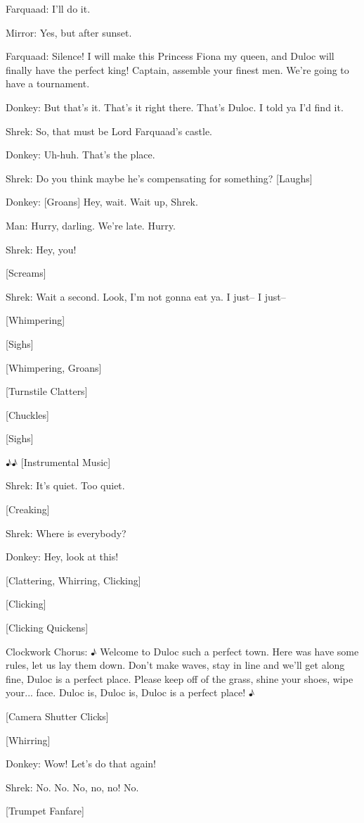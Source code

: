 \documentclass{article}
\begin{document}
Farquaad:
I'll do it.

Mirror:
Yes, but after sunset.

Farquaad:
Silence! I will make this Princess Fiona my queen, and Duloc will finally have the perfect king! Captain, assemble your finest men. We're going to have a tournament.

Donkey:
But that's it. That's it right there. That's Duloc. I told ya I'd find it.

Shrek:
So, that must be Lord Farquaad's castle.

Donkey:
Uh-huh. That's the place.

Shrek:
Do you think maybe he's compensating for something? [Laughs]

Donkey:
[Groans] Hey, wait. Wait up, Shrek.

Man:
Hurry, darling. We're late. Hurry.

Shrek:
Hey, you!

[Screams]

Shrek:
Wait a second. Look, I'm not gonna eat ya. I just-- I just--

[Whimpering]

[Sighs]

[Whimpering, Groans]

[Turnstile Clatters]

[Chuckles]

[Sighs]

♪♪ [Instrumental Music]

Shrek:
It's quiet. Too quiet.

[Creaking]

Shrek:
Where is everybody?

Donkey:
Hey, look at this!

[Clattering, Whirring, Clicking]

[Clicking]

[Clicking Quickens]

Clockwork Chorus: ♪ Welcome to Duloc such a perfect town. Here was have some rules, let us lay them down. Don't make waves, stay in line and we'll get along fine, Duloc is a perfect place. Please keep off of the grass, shine your shoes, wipe your... face. Duloc is, Duloc is, Duloc is a perfect place! ♪

[Camera Shutter Clicks]

[Whirring]

Donkey:
Wow! Let's do that again!

Shrek:
No. No. No, no, no! No.

[Trumpet Fanfare]
\end{document}
